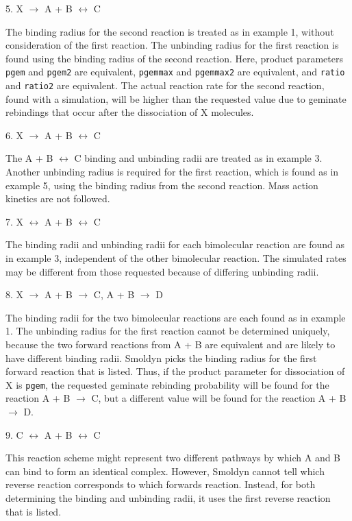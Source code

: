 \documentclass {scrbook}
\newcommand {\ttt} {\texttt}
\begin{document}
\begin{description}
\item{5. X $\rightarrow$ A + B $\leftrightarrow$ C}

The binding radius for the second reaction is treated as in example 1, without consideration of the first reaction. The unbinding radius for the first reaction is found using the binding radius of the second reaction. Here, product parameters \ttt{pgem} and \ttt{pgem2} are equivalent, \ttt{pgemmax} and \ttt{pgemmax2} are equivalent, and \ttt{ratio} and \ttt{ratio2} are equivalent. The actual reaction rate for the second reaction, found with a simulation, will be higher than the requested value due to geminate rebindings that occur after the dissociation of X molecules.

\item{6. X $\rightarrow$ A + B $\leftrightarrow$ C}

The A + B $\leftrightarrow$ C binding and unbinding radii are treated as in example 3. Another unbinding radius is required for the first reaction, which is found as in example 5, using the binding radius from the second reaction. Mass action kinetics are not followed.

\item{7. X $\leftrightarrow$ A + B $\leftrightarrow$ C}

The binding radii and unbinding radii for each bimolecular reaction are found as in example 3, independent of the other bimolecular reaction. The simulated rates may be different from those requested because of differing unbinding radii.

\item{8. X $\rightarrow$ A + B $\rightarrow$ C,   A + B $\rightarrow$ D}

The binding radii for the two bimolecular reactions are each found as in example 1. The unbinding radius for the first reaction cannot be determined uniquely, because the two forward reactions from A + B are equivalent and are likely to have different binding radii. Smoldyn picks the binding radius for the first forward reaction that is listed. Thus, if the product parameter for dissociation of X is \ttt{pgem}, the requested geminate rebinding probability will be found for the reaction A + B $\rightarrow$ C, but a different value will be found for the reaction A + B $\rightarrow$ D.

\item{9. C $\leftrightarrow$ A + B $\leftrightarrow$ C}

This reaction scheme might represent two different pathways by which A and B can bind to form an identical complex. However, Smoldyn cannot tell which reverse reaction corresponds to which forwards reaction. Instead, for both determining the binding and unbinding radii, it uses the first reverse reaction that is listed.
\end{description}
\end{document}
